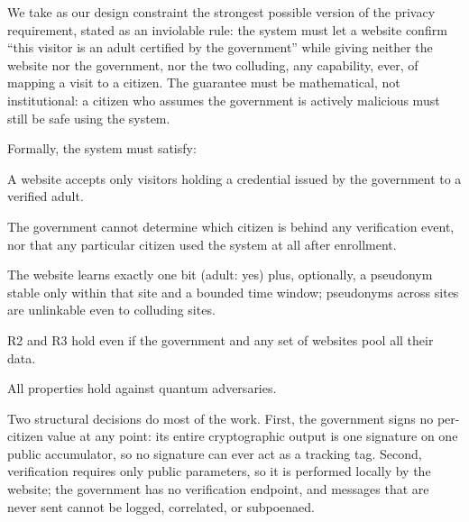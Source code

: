 \documentclass[11pt]{article}
\theoremstyle{definition}
\begin{document}
We take as our design constraint the strongest possible version of the privacy
requirement, stated as an inviolable rule: the system must let a website confirm ``this
visitor is an adult certified by the government'' while giving neither the website nor the
government, nor the two colluding, any capability, ever, of mapping a visit to a citizen.
The guarantee must be mathematical, not institutional: a citizen who assumes the
government is actively malicious must still be safe using the system.

Formally, the system must satisfy:
\begin{description}[leftmargin=2.6em,style=nextline]
\item[R1 (Soundness).] A website accepts only visitors holding a credential issued by the
government to a verified adult.
\item[R2 (Issuer blindness).] The government cannot determine which citizen is behind any
verification event, nor that any particular citizen used the system at all after
enrollment.
\item[R3 (Verifier blindness).] The website learns exactly one bit (adult: yes) plus,
optionally, a pseudonym stable only within that site and a bounded time window; pseudonyms
across sites are unlinkable even to colluding sites.
\item[R4 (Collusion resistance).] R2 and R3 hold even if the government and any set of
websites pool all their data.
\item[R5 (Post-quantum security).] All properties hold against quantum adversaries.
\end{description}

Two structural decisions do most of the work. First, the government signs no per-citizen
value at any point: its entire cryptographic output is one signature on one public
accumulator, so no signature can ever act as a tracking tag. Second, verification requires
only public parameters, so it is performed locally by the website; the government has no
verification endpoint, and messages that are never sent cannot be logged, correlated, or
subpoenaed.
\end{document}
